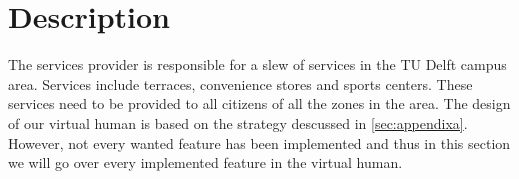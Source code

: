 \section{Description}
The services provider is responsible for a slew of services in the TU Delft campus area. Services include terraces, convenience stores and sports centers. These services need to be provided to all citizens of all the zones in the area. The design of our virtual human is based on the strategy descussed in \ref{sec:appendixa}. However, not every wanted feature has been implemented and thus in this section we will go over every implemented feature in the virtual human.

\subsection{}

\newpage
